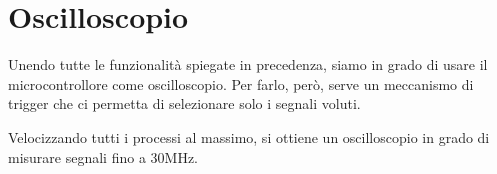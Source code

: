 \pagebreak
\section{Oscilloscopio}

Unendo tutte le funzionalità spiegate in precedenza, siamo in grado di usare il microcontrollore come oscilloscopio. Per farlo, però, serve un meccanismo di trigger che ci permetta di selezionare solo i segnali voluti.



Velocizzando tutti i processi al massimo, si ottiene un oscilloscopio in grado di misurare segnali fino a 30MHz.\\